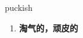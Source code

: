 
\begin{frame}
{\huge puckish}
\begin{center}
\begin{enumerate}\Large
  \item \textbf{淘气的，顽皮的}
\end{enumerate}
\end{center}
\end{frame}
